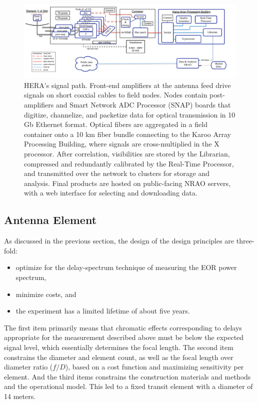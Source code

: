 \documentclass[preprint,11pt]{aastex}
\begin{document}
\begin{figure}[h]
	\centering
	\includegraphics[width=1\textwidth]{plots/HERA_high_level_block_diagram.pdf}
	\caption{HERA's signal path.  Front-end amplifiers at the antenna feed drive signals on short coaxial cables to 
field nodes.  Nodes contain post-amplifiers and Smart Network ADC Processor (SNAP) boards that digitize, channelize,
and packetize data for optical transmission in 10 Gb Ethernet format.  Optical fibers are aggregated in a field container
onto a 10 km fiber bundle connecting to the Karoo Array Processing Building, where signals are cross-multiplied
in the X processor.  After correlation, visibilities are stored by the Librarian, compressed and redundantly calibrated
by the Real-Time Processor, and transmitted over the network to clusters for storage and analysis.  Final products are
hosted on public-facing NRAO servers, with a web interface for selecting and downloading data.}
	\label{fig:overallBlockDiagram}
	\vspace{-5pt}
\end{figure}

\subsection{Antenna Element}
\label{sec:antenna}
\vspace{-5pt}

As discussed in the previous section, the design of the design principles are three-fold:
\begin{itemize}
\item optimize for the delay-spectrum technique of measuring the EOR power spectrum,
\item minimize costs, and
\item the experiment has a limited lifetime of about five years.
\end{itemize}
The first item primarily means that chromatic effects corresponding to delays appropriate for the measurement described above must be below the expected signal level, which essentially determines the focal length.  The second item constrains the diameter and element count, as well as the focal length over diameter ratio ($f/D$), based on a cost function and maximizing sensitivity per element.  And the third items constrains the construction materials and methods and the operational model.  This led to a fixed transit element with a diameter of 14 meters.
\end{document}
